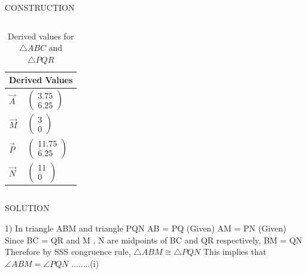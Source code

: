 \documentclass[11pt]{beamer}
\begin{document}
\begin{frame}{CONSTRUCTION}
\begin{columns}
\begin{column}{0.5\textwidth}
\begin{table}[H]
\centering
\resizebox{0.5\textwidth}{!}
{\begin{minipage}{\textwidth}
\begin{tabular}{ |p{1cm}|p{2cm}|  }
\hline
 \multicolumn{2}{|c|}{Derived Values} \\
\hline \centering
$\vec{A}$ & $\begin{pmatrix}3.75\\6.25\end{pmatrix}$\\
\hline \centering
$\vec{M}$ & $\begin{pmatrix}3\\0\end{pmatrix}$\\
\hline \centering
$\vec{P}$ & $\begin{pmatrix}11.75\\6.25\end{pmatrix}$\\
\hline \centering
$\vec{N}$ & $\begin{pmatrix}11\\0\end{pmatrix}$\\
\hline 
\end{tabular}
\end{minipage}}
\caption{\tiny Derived values for $\triangle ABC$ and $\triangle PQR$}
\end{table}

\end{column}
\end{columns}

\end{frame}





\begin{frame}{SOLUTION}
    \begin{flushleft}
       
        1) In triangle ABM and triangle PQN
        \newline
        \newline
        AB = PQ  (Given)
        \newline
        AM = PN  (Given)
        \newline
        Since BC = QR and M , N are midpoints of BC and QR respectively, 
        \newline
        BM = QN 
        \newline 
        Therefore by SSS congruence rule, $\triangle  ABM  \cong   \triangle  PQN$ 
        \newline
        \newline
        This implies that $\angle ABM = \angle PQN$    ........(i)

    \end{flushleft}
 

\end{frame}
\end{document}
